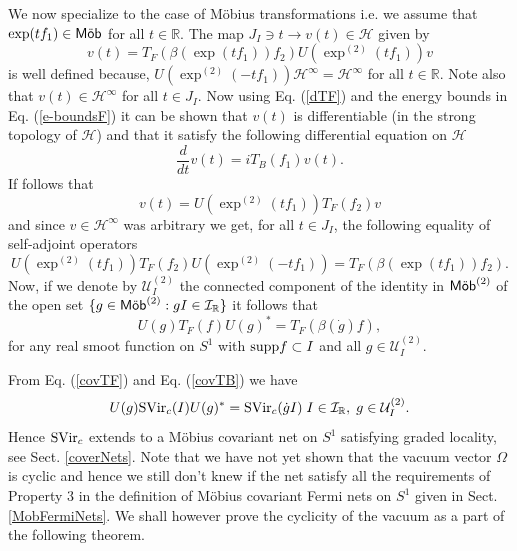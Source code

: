 \documentclass[11pt]{article}
\def\I{{\cal I}}
\def\H{{\cal H}}
\def\U{{\cal U}}
\def\Mob{{\rm\textsf{M\"ob}}}
\def\RR{{\mathbb R}}
\def\H{{\mathcal H}}
\def\I{{\mathcal I}}
\def\U{{\mathcal U}}
\begin{document}
We now specialize to the case of M\"{o}bius transformations i.e. 
we assume that $\exp(tf_1) \in \Mob$ for all $t\in \RR$.   
The map $J_I \ni t \to v(t) \in \H$ given by 
\begin{equation}
v(t)=T_F(\beta(\exp(tf_1))f_2)U(\exp^{(2)}(tf_1))v
\end{equation} 
is well defined because, $U(\exp^{(2)}(-tf_1))\H^\infty = \H^\infty$ 
for all $t\in \RR$. Note also that $v(t)\in \H^\infty$ for all $t\in J_I$.
Now using Eq. (\ref{dTF}) and the energy bounds in Eq. 
(\ref{e-boundsF}) it can be shown that $v(t)$ is differentiable (in the 
strong topology of $\H$) and that it satisfy the following differential 
equation on $\H$ 
\begin{equation}
\frac{d}{dt}v(t)=iT_B(f_1)v(t).
\end{equation}
If follows that 
\begin{equation}
v(t)=U(\exp^{(2)}(tf_1))T_F(f_2)v
\end{equation}
and since $v \in \H^\infty$ was arbitrary we get, for all $t\in J_I$, 
the following equality of self-adjoint operators
\begin{equation}
U(\exp^{(2)}(tf_1))T_F(f_2)U(\exp^{(2)}(-tf_1))=T_F(\beta(\exp(tf_1))f_2). 
\end{equation}
Now, if we denote by $\U^{(2)}_I$ the connected component of the identity 
in $\Mob^{(2)}$
of the open set $\{g\in \Mob^{(2)}: gI \in \I_\RR \}$ it follows that 
\begin{equation}
\label{covTF}
U(g)T_F(f)U(g)^*=T_F(\beta(\dot{g})f),
\end{equation}
for any real smoot function on $S^1$ with ${\rm supp}f \subset I$
and all $g\in \U^{(2)}_I$. 

From Eq. (\ref{covTF}) and Eq. (\ref{covTB}) we have 
\begin{equation}
U(g){\rm SVir}_c (I)U(g)^* = {\rm SVir}_c(\dot{g}I)\; I\in \I_\RR,
\; g \in \U^{(2)}_I. 
\end{equation} 
Hence ${\rm SVir}_c$ extends to a M\"{o}bius covariant  net on 
$S^1$ satisfying graded locality, see Sect. \ref{coverNets}. Note that we 
have not yet shown that the vacuum vector $\Omega$ is cyclic and 
hence we still don't knew if the net satisfy all the requirements of 
Property 3 in the definition of M\"{o}bius covariant Fermi nets on
$S^1$ given in Sect. \ref{MobFermiNets}. 
We shall however prove the cyclicity of the vacuum as a part of the following 
theorem. 
\end{document}
